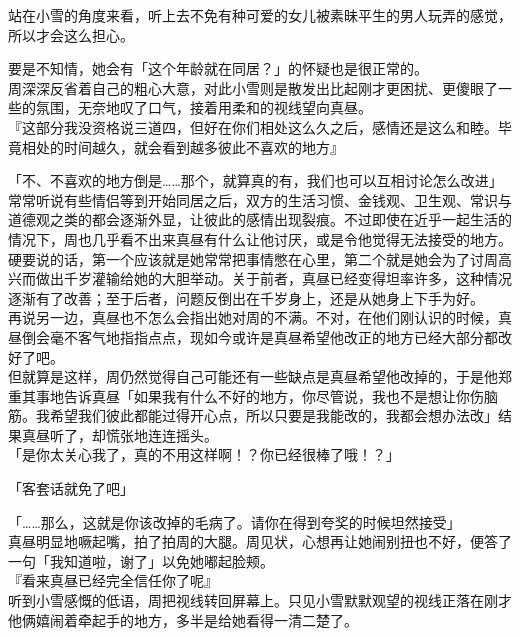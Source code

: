 站在小雪的角度来看，听上去不免有种可爱的女儿被素昧平生的男人玩弄的感觉，所以才会这么担心。

要是不知情，她会有「这个年龄就在同居？」的怀疑也是很正常的。\\

周深深反省着自己的粗心大意，对此小雪则是散发出比起刚才更困扰、更傻眼了一些的氛围，无奈地叹了口气，接着用柔和的视线望向真昼。\\

『这部分我没资格说三道四，但好在你们相处这么久之后，感情还是这么和睦。毕竟相处的时间越久，就会看到越多彼此不喜欢的地方』

「不、不喜欢的地方倒是……那个，就算真的有，我们也可以互相讨论怎么改进」\\

常常听说有些情侣等到开始同居之后，双方的生活习惯、金钱观、卫生观、常识与道德观之类的都会逐渐外显，让彼此的感情出现裂痕。不过即使在近乎一起生活的情况下，周也几乎看不出来真昼有什么让他讨厌，或是令他觉得无法接受的地方。\\

硬要说的话，第一个应该就是她常常把事情憋在心里，第二个就是她会为了讨周高兴而做出千岁灌输给她的大胆举动。关于前者，真昼已经变得坦率许多，这种情况逐渐有了改善；至于后者，问题反倒出在千岁身上，还是从她身上下手为好。\\

再说另一边，真昼也不怎么会指出她对周的不满。不对，在他们刚认识的时候，真昼倒会毫不客气地指指点点，现如今或许是真昼希望他改正的地方已经大部分都改好了吧。\\

但就算是这样，周仍然觉得自己可能还有一些缺点是真昼希望他改掉的，于是他郑重其事地告诉真昼「如果我有什么不好的地方，你尽管说，我也不是想让你伤脑筋。我希望我们彼此都能过得开心点，所以只要是我能改的，我都会想办法改」结果真昼听了，却慌张地连连摇头。\\

「是你太关心我了，真的不用这样啊！？你已经很棒了哦！？」

「客套话就免了吧」

「……那么，这就是你该改掉的毛病了。请你在得到夸奖的时候坦然接受」\\

真昼明显地噘起嘴，拍了拍周的大腿。周见状，心想再让她闹别扭也不好，便答了一句「我知道啦，谢了」以免她嘟起脸颊。\\

『看来真昼已经完全信任你了呢』\\

听到小雪感慨的低语，周把视线转回屏幕上。只见小雪默默观望的视线正落在刚才他俩嬉闹着牵起手的地方，多半是给她看得一清二楚了。\\

